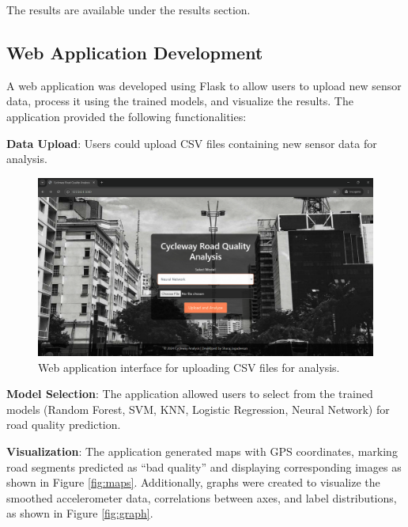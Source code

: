 \documentclass[a4paper,12pt]{Classes/RoboticsLaTeX}
\begin{document}
\begin{abstracts}
The results are available under the results section.

\subsection{Web Application Development}

A web application was developed using Flask to allow users to upload new sensor data, process it using the trained models, and visualize the results. The application provided the following functionalities:

\textbf{Data Upload}: Users could upload CSV files containing new sensor data for analysis.

\begin{figure}[H]
\centering
\includegraphics[width=\linewidth]{Figures/Screenshot1.png}
\caption{Web application interface for uploading CSV files for analysis.}
\label{fig:upload}
\end{figure}

\vspace{10pt}

\textbf{Model Selection}: The application allowed users to select from the trained models (Random Forest, SVM, KNN, Logistic Regression, Neural Network) for road quality prediction.

\vspace{10pt}

\textbf{Visualization}: The application generated maps with GPS coordinates, marking road segments predicted as ``bad quality'' and displaying corresponding images as shown in Figure \ref{fig:maps}. Additionally, graphs were created to visualize the smoothed accelerometer data, correlations between axes, and label distributions, as shown in Figure \ref{fig:graph}.


\end{abstracts}
\end{document}
